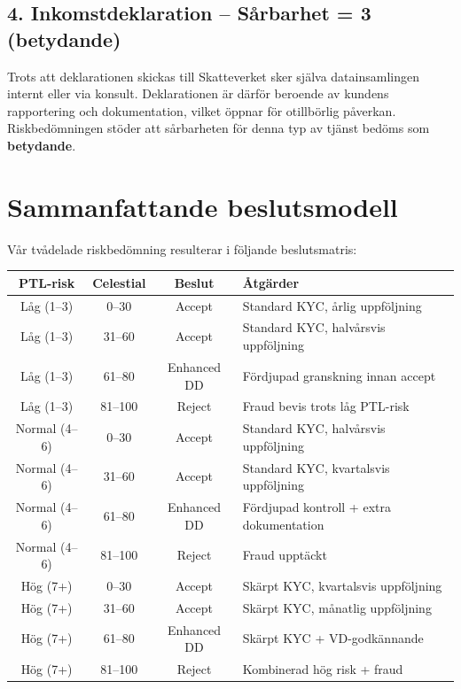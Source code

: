 \documentclass{article}
\begin{document}
\subsection*{4. Inkomstdeklaration – Sårbarhet = 3 (betydande)}
Trots att deklarationen skickas till Skatteverket sker själva datainsamlingen internt eller via konsult. Deklarationen är därför beroende av kundens rapportering och dokumentation, vilket öppnar för otillbörlig påverkan. Riskbedömningen stöder att sårbarheten för denna typ av tjänst bedöms som \textbf{betydande}.

\newpage
\section*{Sammanfattande beslutsmodell}

Vår tvådelade riskbedömning resulterar i följande beslutsmatris:

\begin{center}
\renewcommand{\arraystretch}{1.8}
\begin{tabular}{|c|c|c|p{6cm}|}
\hline
\textbf{PTL-risk} & \textbf{Celestial} & \textbf{Beslut} & \textbf{Åtgärder} \\
\hline
Låg (1--3) & 0--30 & Accept & Standard KYC, årlig uppföljning \\
\hline
Låg (1--3) & 31--60 & Accept & Standard KYC, halvårsvis uppföljning \\
\hline
Låg (1--3) & 61--80 & Enhanced DD & Fördjupad granskning innan accept \\
\hline
Låg (1--3) & 81--100 & Reject & Fraud bevis trots låg PTL-risk \\
\hline
Normal (4--6) & 0--30 & Accept & Standard KYC, halvårsvis uppföljning \\
\hline
Normal (4--6) & 31--60 & Accept & Standard KYC, kvartalsvis uppföljning \\
\hline
Normal (4--6) & 61--80 & Enhanced DD & Fördjupad kontroll + extra dokumentation \\
\hline
Normal (4--6) & 81--100 & Reject & Fraud upptäckt \\
\hline
Hög (7+) & 0--30 & Accept & Skärpt KYC, kvartalsvis uppföljning \\
\hline
Hög (7+) & 31--60 & Accept & Skärpt KYC, månatlig uppföljning \\
\hline
Hög (7+) & 61--80 & Enhanced DD & Skärpt KYC + VD-godkännande \\
\hline
Hög (7+) & 81--100 & Reject & Kombinerad hög risk + fraud \\
\hline
\end{tabular}
\end{center}
\end{document}
